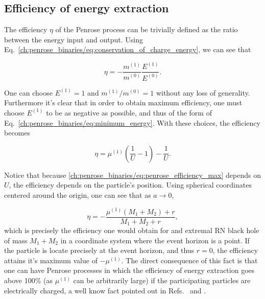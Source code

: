 \subsection{Efficiency of energy extraction}

The efficiency $\eta$ of the Penrose process can be trivially defined as the ratio between the energy input and output. Using Eq.~\eqref{ch:penrose_binaries/eq:conservation_of_charge_energy}, we can see that

\begin{equation}
  \eta = - \frac{m^{(1)}}{m^{(0)}} \frac{E^{(1)}}{E^{(0)}}.
  \label{ch:penrose_binaries/eq:penrose_efficiency_general}
\end{equation}

One can choose $E^{(1)} = 1$ and $m^{(1)}/m^{(0)} = 1$ without any loss of generality. Furthermore it's clear that in order to obtain maximum efficiency, one must choose $E^{(1)}$ to be as negative as possible, and thus of the form of Eq.~\eqref{ch:penrose_binaries/eq:minimum_energy}. With these choices, the efficiency becomes

\begin{equation}
  \eta = \mu^{(1)}\left(\frac{1}{U} - 1\right) - \frac{1}{U}.
  \label{ch:penrose_binaries/eq:penrose_efficiency_max}
\end{equation}

Notice that because \eqref{ch:penrose_binaries/eq:penrose_efficiency_max} depends on $U$, the efficiency depends on the particle's position. Using spherical coordinates centered around the origin, one can see that as $a\rightarrow 0$,

\begin{equation}
  \eta = -\frac{\mu^{(1)}(M_1 + M_2) + r}{M_1 + M_2 + r},
  \label{ch:penrose_binaries/eq:a_zero_efficiency}
\end{equation}
%
which is precisely the efficiency one would obtain for and extremal RN black hole of mass $M_1 + M_2$ in a coordinate system where the event horizon is a point. If the particle is locate precisely at the event horizon, and thus $r = 0$, the efficiency attains it's maximum value of $-\mu^{(1)}$. The direct consequence of this fact is that one can have Penrose processes in which the efficiency of energy extraction goes above 100\% (as $\mu^{(1)}$ can be arbitrarily large) if the participating particles are electrically charged, a well know fact pointed out in Refs.~\cite{bhat1985energetics} and \cite{parthasarathy1986high}.

